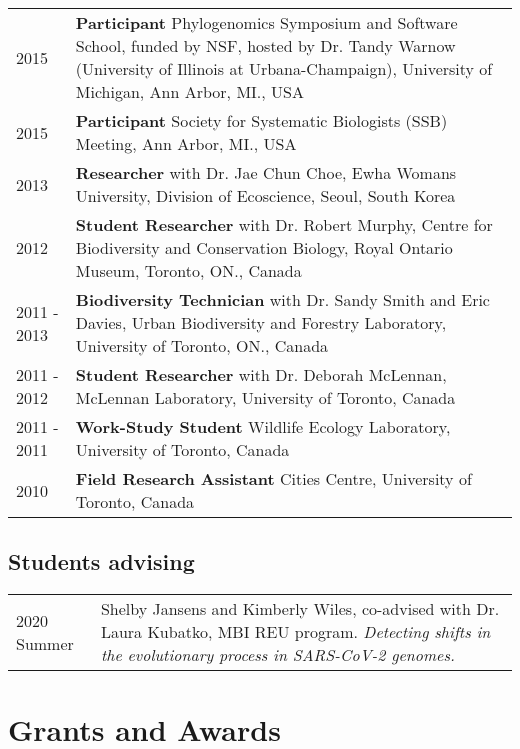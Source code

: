 \documentclass[11pt]{article}
\begin{document}
\begin{longtable}{p{}  p{}}
2015 &	\textbf{Participant} Phylogenomics Symposium and Software School, funded by NSF, hosted by Dr. Tandy Warnow (University of Illinois at Urbana-Champaign), University of Michigan, Ann Arbor, MI., USA\\
2015 &	\textbf{Participant} Society for Systematic Biologists (SSB) Meeting, Ann Arbor, MI., USA\\
2013 &	\textbf{Researcher} with Dr. Jae Chun Choe, Ewha Womans University, Division of Ecoscience, Seoul, South Korea\\
2012 &	\textbf{Student Researcher} with Dr. Robert Murphy, Centre for Biodiversity and Conservation Biology, Royal Ontario Museum, Toronto, ON., Canada\\
2011 - 2013 &	\textbf{Biodiversity Technician} with Dr. Sandy Smith and Eric Davies, Urban Biodiversity and Forestry Laboratory, University of Toronto, ON., Canada\\
2011 - 2012 &	\textbf{Student Researcher} with Dr. Deborah McLennan, McLennan Laboratory, University of Toronto, Canada\\
2011 - 2011&	\textbf{Work-Study Student} Wildlife Ecology Laboratory, University of Toronto, Canada\\
2010 & \textbf{Field Research Assistant} Cities Centre, University of Toronto, Canada\\

\end{longtable}

\subsection*{Students advising}

\begin{longtable}{p{}  p{}}

2020 Summer&Shelby Jansens and Kimberly Wiles, co-advised with Dr. Laura Kubatko, MBI REU program. \textit{Detecting shifts in the evolutionary process in SARS-CoV-2 genomes.}\\

\end{longtable}

\hspace{0pt}
\section*{Grants and Awards}
\end{document}
